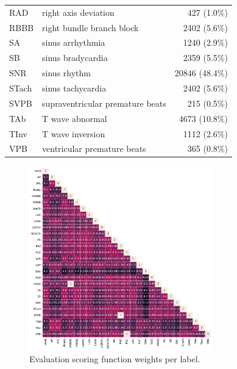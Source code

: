 \documentclass[\main/thesis.tex]{subfiles}
\begin{document}
\begin{table}[t]
{\begin{tabular}{@{}l@{}l@{}r@{}}
    RAD & right axis deviation & 427 (1.0\%) \\
    RBBB & right bundle branch block & 2402 (5.6\%) \\
    SA & sinus arrhythmia & 1240 (2.9\%) \\
    SB & sinus bradycardia & 2359 (5.5\%) \\
    SNR & sinus rhythm & 20846 (48.4\%)  \\
    STach & sinus tachycardia & 2402 (5.6\%) \\
    SVPB & supraventricular premature beats & 215 (0.5\%) \\
    TAb & T wave abnormal & 4673 (10.8\%)  \\
    TInv & T wave inversion & 1112 (2.6\%) \\
    VPB & ventricular premature beats & 365 (0.8\%) \\ \hline
    \end{tabular}}
\end{table}

\begin{figure}[t]
    \centering
    \includegraphics[trim={0.3cm 0.3cm 0.3cm 0.3cm},clip,width=8cm]{figure/aenc_label_weights.pdf}
    \caption{Evaluation scoring function weights per label.}
    \label{fig:dataset_labeldx}
\end{figure}
\end{document}
